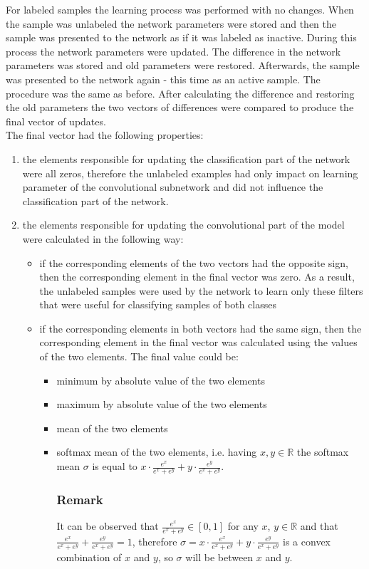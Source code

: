 \documentclass[a4paper,10pt]{report}
\begin{document}
      For labeled samples the learning process was performed with no changes. When the sample was unlabeled the network parameters were stored and then the sample was presented to the network as if it was labeled as inactive. During this process the network parameters were updated. The difference in the network parameters was stored and old parameters were restored. Afterwards, the sample was presented to the network again - this time as an active sample. The procedure was the same as before. After calculating the difference and restoring the old parameters the two vectors of differences were compared to produce the final vector of updates.\\
           
           
      The final vector had the following properties:
      \begin{enumerate}
       \item the elements responsible for updating the classification part of the network were all zeros, therefore the unlabeled examples had only impact on learning parameter of the convolutional subnetwork and did not influence the classification part of the network.\\
       \item the elements responsible for updating the convolutional part of the model were calculated in the following way:
	\begin{itemize}
	 \item if the corresponding elements of the two vectors had the opposite sign, then the corresponding element in the final vector was zero. As a result, the unlabeled samples were used by the network to learn only these filters that were useful for classifying samples of both classes
	  \item if the corresponding elements in both vectors had the same sign, then the corresponding element in the final vector was calculated using the values of the two elements. The final value could be:
	  \begin{itemize}
	    \item minimum by absolute value of the two elements
	    \item maximum by absolute value of the two elements
	    \item mean of the two elements
	    \item softmax mean of the two elements, i.e. having $x, y \in \mathbb{R}$ the softmax mean $\sigma$ is equal to $x \cdot \frac{e^x}{e^x + e^y} + y \cdot \frac{e^y}{e^x + e^y}$.
	    
	    \subsubsection{Remark}
	      It can be observed that $\frac{e^x}{e^x + e^y} \in [0, 1]$ for any $x$, $y \in \mathbb{R}$ and that $\frac{e^x}{e^x + e^y} + \frac{e^y}{e^x + e^y} = 1$, therefore $\sigma = x \cdot \frac{e^x}{e^x + e^y} + y \cdot \frac{e^y}{e^x + e^y}$ is a convex combination of $x$ and $y$, so $\sigma$ will be between $x$ and $y$.\\
	  \end{itemize}
	\end{itemize}
      \end{enumerate}
\end{document}
